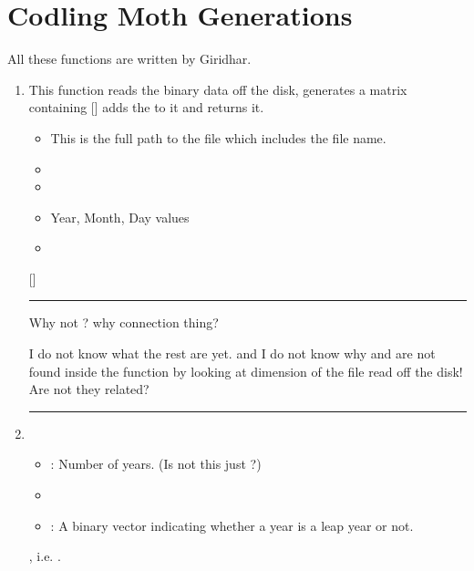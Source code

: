 
\section{Codling Moth Generations}

All these functions are written by Giridhar.

\begin{enumerate}

\item {}
This function reads the binary data off the disk, 
generates a matrix containing [] 
adds the  to it and returns it.

\begin{itemize}
\item {} This is the full path to the file which includes the file name.
\item {}
\item {}
\item {} Year, Month, Day values
\item {}
\end{itemize}

 []

\hrule

Why not ? why connection thing?

I do not know what the rest are yet. and I do not 
know why  and {}
are not found inside the function by looking at dimension of 
the file read off the disk! Are not they related?

\hrule


\pagebreak

\item {}

\begin{itemize}
\item {}: Number of years. (Is not this just ?)
\item {}
\item {}: A binary vector indicating whether a year is a leap year or not.
\end{itemize}
 , i.e. .


\end{enumerate}
